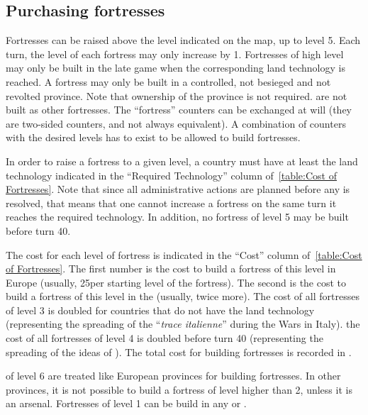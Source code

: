 \subsection{Purchasing fortresses}

\aparag[Generalities.] Fortresses can be raised above the level indicated on
the map, up to level 5.
\bparag Each turn, the level of each fortress may only increase by 1.
\bparag Fortresses of high level may only be built in the late game when the
corresponding land technology is reached.
\bparag A fortress may only be built in a controlled, not besieged and not
revolted province. Note that ownership of the province is not required.
\bparag \Presidios are not built as other fortresses.
\bparag The ``fortress'' counters can be exchanged at will (they are two-sided
counters, and not always equivalent). A combination of counters with the
desired levels has to exist to be allowed to build fortresses.

\aparag[Technology.] In order to raise a fortress to a given level, a country
must have at least the land technology indicated in the ``Required
Technology'' column of~\ref{table:Cost of Fortresses}. Note that since all
administrative actions are planned before any is resolved, that means that one
cannot increase a fortress on the same turn it reaches the required
technology.
\bparag In addition, no fortress of level 5 may be built before turn 40.

\aparag[Cost.] The cost for each level of fortress is indicated in the
``Cost'' column of~\ref{table:Cost of Fortresses}.
\bparag The first number is the cost to build a fortress of this level in
Europe (usually, 25\ducats per starting level of the fortress). The second is
the cost to build a fortress of this level in the \ROTW (usually, twice more).
\bparag The cost of all fortresses of level 3 is doubled for countries that do
not have the land technology \TARQ (representing the spreading of the
``\emph{trace italienne}'' during the Wars in Italy).
\bparag the cost of all fortresses of level 4 is doubled before turn 40
(representing the spreading of the ideas of ).
\bparag The total cost for building fortresses is recorded in
.

\aparag[\ROTW.] \COL of level 6 are treated like European provinces for
building fortresses.
\bparag In other provinces, it is not possible to build a fortress of level
higher than 2, unless it is an arsenal.
\bparag Fortresses of level 1 can be build in any \COL or \TP.

